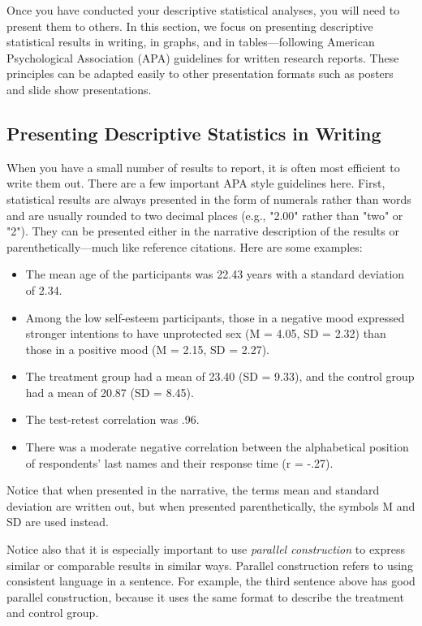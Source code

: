 Once you have conducted your descriptive statistical analyses, you will need to present them to others. In this section, we focus on presenting descriptive statistical results in writing, in graphs, and in tables---following American Psychological Association (APA) guidelines for written research reports. These principles can be adapted easily to other presentation formats such as posters and slide show presentations.


\subsection{Presenting Descriptive Statistics in Writing}


When you have a small number of results to report, it is often most efficient to write them out. There are a few important APA style guidelines here. First, statistical results are always presented in the form of numerals rather than words and are usually rounded to two decimal places (e.g., "2.00" rather than "two" or "2"). They can be presented either in the narrative description of the results or parenthetically---much like reference citations. Here are some examples:


\begin{itemize}
\item The mean age of the participants was 22.43 years with a standard deviation of 2.34.


\item Among the low self-esteem participants, those in a negative mood expressed stronger intentions to have unprotected sex (M = 4.05, SD = 2.32) than those in a positive mood (M = 2.15, SD = 2.27).


\item The treatment group had a mean of 23.40 (SD = 9.33), and the control group had a mean of 20.87 (SD = 8.45).


\item The test-retest correlation was .96.


\item There was a moderate negative correlation between the alphabetical position of respondents' last names and their response time (r = -.27).
\end{itemize}


Notice that when presented in the narrative, the terms mean and standard deviation are written out, but when presented parenthetically, the symbols M and SD are used instead. 

Notice also that it is especially important to use \emph{parallel construction} to express similar or comparable results in similar ways. Parallel construction refers to using consistent language in a sentence. For example, the third sentence above has good parallel construction, because it uses the same format to describe the treatment and control group.

